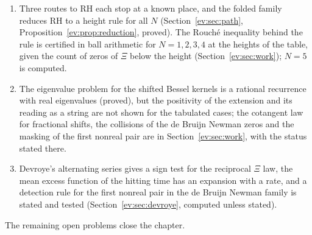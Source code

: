 \begin{enumerate}
\item Three routes to RH each stop at a known place, and the folded family reduces RH to a height rule for all $N$ (Section~\ref{ev:sec:path}, Proposition~\ref{ev:prop:reduction}, proved). The Rouch\'e inequality behind the rule is certified in ball arithmetic for $N=1,2,3,4$ at the heights of the table, given the count of zeros of $\Xi$ below the height (Section~\ref{ev:sec:work}); $N=5$ is computed.
\item The eigenvalue problem for the shifted Bessel kernels is a rational recurrence with real eigenvalues (proved), but the positivity of the extension and its reading as a string are not shown for the tabulated cases; the cotangent law for fractional shifts, the collisions of the de Bruijn Newman zeros and the masking of the first nonreal pair are in Section~\ref{ev:sec:work}, with the status stated there.
\item Devroye's alternating series gives a sign test for the reciprocal $\Xi$ law, the mean excess function of the hitting time has an expansion with a rate, and a detection rule for the first nonreal pair in the de Bruijn Newman family is stated and tested (Section~\ref{ev:sec:devroye}, computed unless stated).
\end{enumerate}
The remaining open problems close the chapter.
